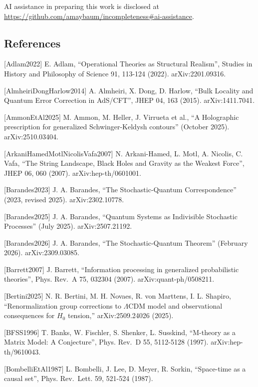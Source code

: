 \documentclass[
]{article}
\begin{document}
AI assistance in preparing this work is disclosed at\\
\url{https://github.com/amaybaum/incompleteness\#ai-assistance}.

\hypertarget{references}{%
\subsection{References}\label{references}}

{[}Adlam2022{]} E. Adlam, ``Operational Theories as Structural
Realism'', Studies in History and Philosophy of Science 91, 113-124
(2022). arXiv:2201.09316.

{[}AlmheiriDongHarlow2014{]} A. Almheiri, X. Dong, D. Harlow, ``Bulk
Locality and Quantum Error Correction in AdS/CFT'', JHEP 04, 163 (2015).
arXiv:1411.7041.

{[}AmmonEtAl2025{]} M. Ammon, M. Heller, J. Virrueta et al., ``A
Holographic prescription for generalized Schwinger-Keldysh contours''
(October 2025). arXiv:2510.03404.

{[}ArkaniHamedMotlNicolisVafa2007{]} N. Arkani-Hamed, L. Motl, A.
Nicolis, C. Vafa, ``The String Landscape, Black Holes and Gravity as the
Weakest Force'', JHEP 06, 060 (2007). arXiv:hep-th/0601001.

{[}Barandes2023{]} J. A. Barandes, ``The Stochastic-Quantum
Correspondence'' (2023, revised 2025). arXiv:2302.10778.

{[}Barandes2025{]} J. A. Barandes, ``Quantum Systems as Indivisible
Stochastic Processes'' (July 2025). arXiv:2507.21192.

{[}Barandes2026{]} J. A. Barandes, ``The Stochastic-Quantum Theorem''
(February 2026). arXiv:2309.03085.

{[}Barrett2007{]} J. Barrett, ``Information processing in generalized
probabilistic theories'', Phys. Rev.~A 75, 032304 (2007).
arXiv:quant-ph/0508211.

{[}Bertini2025{]} N. R. Bertini, M. H. Novaes, R. von Marttens, I. L.
Shapiro, ``Renormalization group corrections to \(\Lambda\)CDM model and
observational consequences for \(H_0\) tension,'' arXiv:2509.24026
(2025).

{[}BFSS1996{]} T. Banks, W. Fischler, S. Shenker, L. Susskind,
``M-theory as a Matrix Model: A Conjecture'', Phys. Rev.~D 55, 5112-5128
(1997). arXiv:hep-th/9610043.

{[}BombelliEtAl1987{]} L. Bombelli, J. Lee, D. Meyer, R. Sorkin,
``Space-time as a causal set'', Phys. Rev.~Lett. 59, 521-524 (1987).
\end{document}
